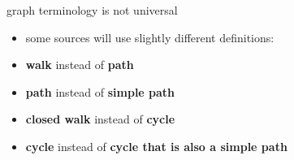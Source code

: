 \begin{frame}{graph terminology is not universal}
\begin{itemize}
\item some sources will use slightly different definitions:
\vspace{.5cm}
\item \textbf{walk} instead of \textbf{path}
\item \textbf{path} instead of \textbf{simple path}
\item \textbf{closed walk} instead of \textbf{cycle}
\item \textbf{cycle} instead of \textbf{cycle that is also a simple path}
\end{itemize}
\end{frame}

